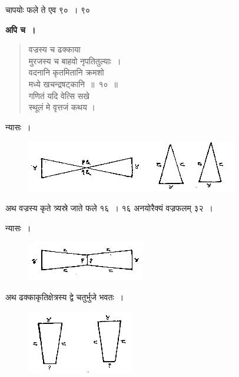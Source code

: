 \documentclass[11pt, openany]{book}
\begin{document}
चापयोः फले ते एव ९०~। ९०

\newpage
 \textbf{अपि च~।} 
\begin{quote}
    \bqt 
     वज्रस्य च ढक्काया \\
     मुरजस्य च बाहवो नृपतितुल्याः~।\\
वदनानि कृतमितानि क्रमशो \\
मध्ये खचन्द्रषट्कानि~॥~१०~॥\\
गणितं यदि वेत्सि सखे \\
स्थूलं मे वृत्तजं कथय ।
\end{quote}

 न्यासः~। 
 \vspace{-4mm}

\begin{figure}[h!]
    \centering
    \includegraphics[scale=0.8]{graphics/capture12.png}
\end{figure}

\vspace{-2mm}
 अथ वज्रस्य कृते त्र्यस्रे जाते फले १६~। १६ अनयोरैक्यं वज्रफलम् ३२~। \\
 \vspace{-2mm}

\indent न्यासः~। 
\vspace{-2mm}

\begin{figure}[h!]
    \centering
    \includegraphics[scale=0.8]{graphics/capture13.png}
\captionsetup{labelformat=empty}
\end{figure}
\vspace{-2mm}

अथ ढक्काकृतिक्षेत्रस्य द्वे चतुर्भुजे भवतः~।
\vspace{-2mm}

\begin{figure}[h!]
    \centering
    \includegraphics[scale=0.8]{graphics/capture14.png}
\captionsetup{labelformat=empty}
\end{figure}
\vspace{-2mm}
\end{document}
